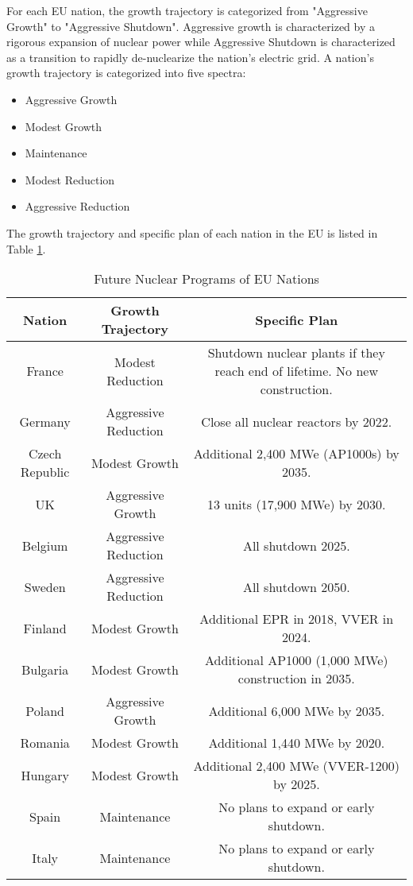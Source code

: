 For each \gls{EU} nation, the growth trajectory is categorized from
"Aggressive Growth" to "Aggressive Shutdown". Aggressive growth is
characterized by a rigorous expansion of nuclear power while 
Aggressive Shutdown is characterized as a transition to rapidly
de-nuclearize the nation's electric grid. A nation's growth trajectory is
categorized into five spectra:

\begin{itemize}
	\item Aggressive Growth
	\item Modest Growth 
	\item Maintenance
	\item Modest Reduction
	\item Aggressive Reduction
\end{itemize}

The growth trajectory and specific plan of each nation in the \gls{EU} 
is listed in Table \ref{tab:eu_growth}.

\begin{table}[h]
	\centering
		\begin{tabular}{|c|c|c|}
			\hline
			Nation & Growth Trajectory & Specific Plan \\
			\hline
			France & Modest Reduction & Shutdown nuclear plants if they reach end of lifetime. No new construction.\\
			Germany & Aggressive Reduction & Close all nuclear reactors by 2022.\\
			Czech Republic & Modest Growth & Additional 2,400 MWe (AP1000s) by 2035.\\
			UK & Aggressive Growth & 13 units (17,900 MWe) by 2030.\\
			Belgium & Aggressive Reduction & All shutdown 2025.\\
			Sweden & Aggressive Reduction & All shutdown 2050.\\
			Finland & Modest Growth & Additional EPR in 2018, VVER in 2024.\\
			Bulgaria & Modest Growth & Additional AP1000 (1,000 MWe) construction in 2035. \\
			Poland & Aggressive Growth & Additional 6,000 MWe by 2035.\\
			Romania & Modest Growth & Additional 1,440 MWe by 2020. \\
			Hungary & Modest Growth & Additional 2,400 MWe (VVER-1200) by 2025. \\ 
			Spain & Maintenance & No plans to expand or early shutdown. \\
			Italy & Maintenance  & No plans to expand or early shutdown. \\
			\hline
		\end{tabular}

	\caption {Future Nuclear Programs of \gls{EU} Nations \cite{world_nuclear_association_nuclear_2017}}
  \label{tab:eu_growth}
\end{table}

